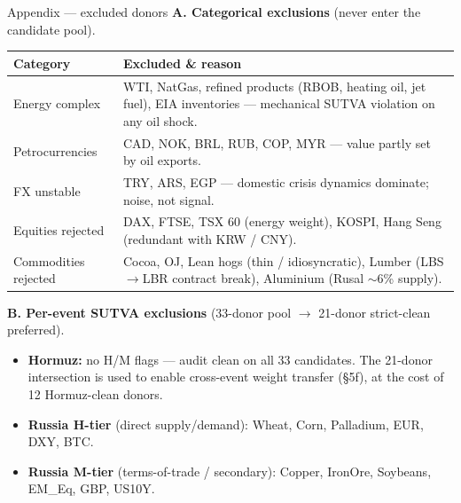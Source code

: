 \documentclass[aspectratio=169,11pt]{beamer}
\newcommand{\smalltext}[1]{{\footnotesize\textcolor{muted}{#1}}}
\newcommand{\hd}[1]{\textbf{#1}}
\begin{document}
\begin{frame}[shrink=10]{Appendix --- excluded donors}
  \footnotesize
  \hd{A. Categorical exclusions} \smalltext{(never enter the candidate pool).}
  \vspace{0.2em}
  \begin{tabular}{@{}p{} p{}@{}}
    \toprule
    \hd{Category} & \hd{Excluded \& reason} \\
    \midrule
    Energy complex        & WTI, NatGas, refined products (RBOB, heating oil, jet fuel), EIA inventories --- mechanical SUTVA violation on any oil shock. \\
    Petrocurrencies       & CAD, NOK, BRL, RUB, COP, MYR --- value partly set by oil exports. \\
    FX unstable           & TRY, ARS, EGP --- domestic crisis dynamics dominate; noise, not signal. \\
    Equities rejected     & DAX, FTSE, TSX 60 (energy weight), KOSPI, Hang Seng (redundant with KRW / CNY). \\
    Commodities rejected  & Cocoa, OJ, Lean hogs (thin / idiosyncratic), Lumber (LBS$\rightarrow$LBR contract break), Aluminium (Rusal $\sim$6\% supply). \\
    \bottomrule
  \end{tabular}

  \vspace{0.6em}
  \hd{B. Per-event SUTVA exclusions} \smalltext{(33-donor pool $\rightarrow$ 21-donor strict-clean preferred).}
  \begin{itemize}\setlength\itemsep{0.1em}
    \item \hd{Hormuz:} no H/M flags --- audit clean on all 33 candidates. The 21-donor intersection is used to enable cross-event weight transfer (\S5f), at the cost of 12 Hormuz-clean donors.
    \item \hd{Russia H-tier} \smalltext{(direct supply/demand)}: Wheat, Corn, Palladium, EUR, DXY, BTC.
    \item \hd{Russia M-tier} \smalltext{(terms-of-trade / secondary)}: Copper, IronOre, Soybeans, EM\_Eq, GBP, US10Y.
  \end{itemize}
  \normalsize
\end{frame}
\end{document}
